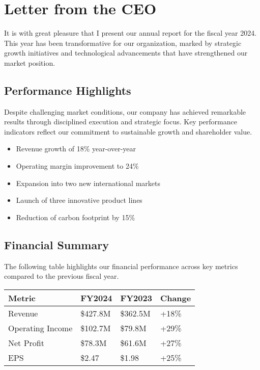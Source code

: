 \documentclass[11pt,a4paper]{article}
\begin{document}

\templateThreeTable

\section{Letter from the CEO}

\color{primary}
It is with great pleasure that I present our annual report for the fiscal year 2024. This year has been transformative for our organization, marked by strategic growth initiatives and technological advancements that have strengthened our market position.

\subsection{Performance Highlights}

Despite challenging market conditions, our company has achieved remarkable results through disciplined execution and strategic focus. Key performance indicators reflect our commitment to sustainable growth and shareholder value.

\begin{itemize}
  \item Revenue growth of 18\% year-over-year
  \item Operating margin improvement to 24\%
  \item Expansion into two new international markets
  \item Launch of three innovative product lines
  \item Reduction of carbon footprint by 15\%
\end{itemize}

\subsection{Financial Summary}

The following table highlights our financial performance across key metrics compared to the previous fiscal year.

\begin{center}
\begin{tabularx}{\textwidth}{|X|X|X|X|}
\hline
\textbf{Metric} & \textbf{FY2024} & \textbf{FY2023} & \textbf{Change} \\
\hline
Revenue & \$427.8M & \$362.5M & +18\% \\
\hline
Operating Income & \$102.7M & \$79.8M & +29\% \\
\hline
Net Profit & \$78.3M & \$61.6M & +27\% \\
\hline
EPS & \$2.47 & \$1.98 & +25\% \\
\hline
\end{tabularx}
\end{center}
\end{document}
